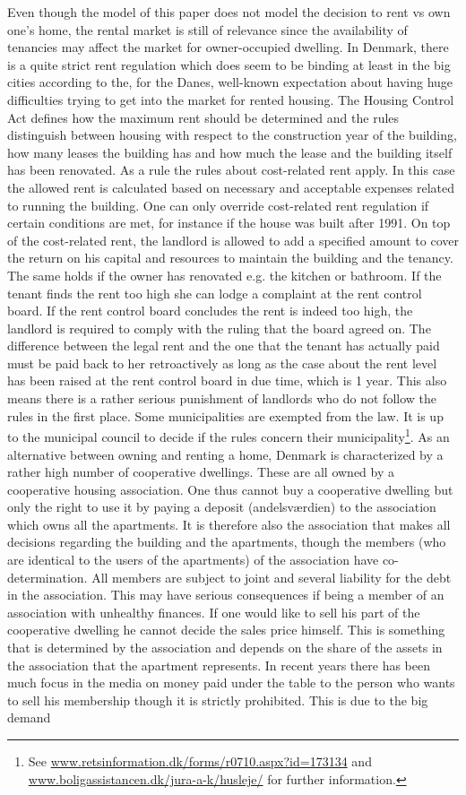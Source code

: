 Even though the model of this paper does not model the decision to rent vs own one's home, the rental market is still of relevance since the availability of tenancies may affect the market for owner-occupied dwelling. In Denmark, there is a quite strict rent regulation which does seem to be binding at least in the big cities according to the, for the Danes, well-known expectation about having huge difficulties trying to get into the market for rented housing. The Housing Control Act defines how the maximum rent should be determined and the rules distinguish between housing with respect to the construction year of the building, how many leases the building has and how much the lease and the building itself has been renovated. As a rule the rules about cost-related rent apply. In this case the allowed rent is calculated based on necessary and acceptable expenses related to running the building. One can only override cost-related rent regulation if certain conditions are met, for instance if the house was built after 1991. On top of the cost-related rent, the landlord is allowed to add a specified amount to cover the return on his capital and resources to maintain the building and the tenancy. The same holds if the owner has renovated e.g. the kitchen or bathroom. If the tenant finds the rent too high she can lodge a complaint at the rent control board. If the rent control board concludes the rent is indeed too high, the landlord is required to comply with the ruling that the board agreed on. The difference between the legal rent and the one that the tenant has actually paid must be paid back to her retroactively as long as the case about the rent level has been raised at the rent control board in due time, which is 1 year. This also means there is a rather serious punishment of landlords who do not follow the rules in the first place. Some municipalities are exempted from the law. It is up to the municipal council to decide if the rules concern their municipality\footnote{See \url{www.retsinformation.dk/forms/r0710.aspx?id=173134} and  \url{www.boligassistancen.dk/jura-a-k/husleje/} for further information.}. As an alternative between owning and renting a home, Denmark is characterized by a rather high number of cooperative dwellings. These are all owned by a cooperative housing association. One thus cannot buy a cooperative dwelling but only the right to use it by paying a deposit (andelsværdien) to the association which owns all the apartments. It is therefore also the association that makes all decisions regarding the building and the apartments, though the members (who are identical to the users of the apartments) of the association have co-determination. All members are subject to joint and several liability for the debt in the association. This may have serious consequences if being a member of an association with unhealthy finances. If one would like to sell his part of the cooperative dwelling he cannot decide the sales price himself. This is something that is determined by the association and depends on the share of the assets in the association that the apartment represents. In recent years there has been much focus in the media on money paid under the table to the person who wants to sell his membership though it is strictly prohibited. This is due to the big demand 